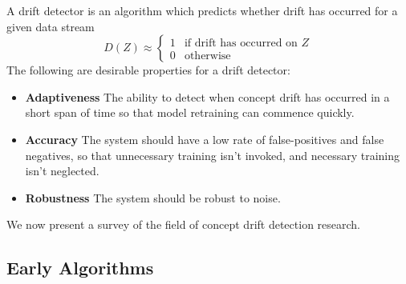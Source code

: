 A drift detector is an algorithm which predicts whether drift has occurred for a given data stream
\begin{equation}
    D(Z) \approx \begin{cases}
    1 & \text{if drift has occurred on $Z$} \\
    0 & \text{otherwise}
    \end{cases}
\end{equation}
The following are desirable properties for a drift detector:
\begin{itemize}
    \item {\bf Adaptiveness} The ability to detect when concept drift has occurred in a short span of time so that model retraining can commence quickly.
    \item {\bf Accuracy} The system should have a low rate of false-positives and false negatives, so that unnecessary training isn't invoked, and necessary training isn't neglected.
    \item {\bf Robustness} The system should be robust to noise.
\end{itemize}
We now present a survey of the field of concept drift detection research.


\subsection{Early Algorithms}

